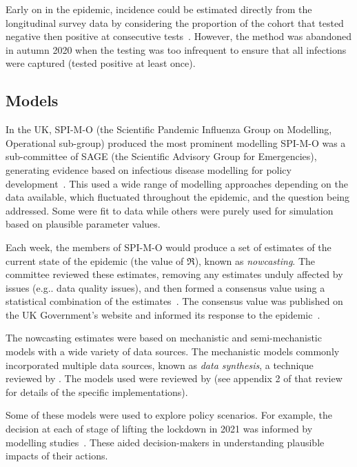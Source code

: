\documentclass[thesis.tex]{subfiles}
\begin{document}
Early on in the epidemic, incidence could be estimated directly from the longitudinal survey data by considering the proportion of the cohort that tested negative then positive at consecutive tests~\autocite{onsIncidenceOld}.
However, the method was abandoned in autumn 2020 when the testing was too infrequent to ensure that all infections were captured (\ie tested positive at least once).

\subsection{Models}

In the UK, SPI-M-O (the Scientific Pandemic Influenza Group on Modelling, Operational sub-group) produced the most prominent modelling
SPI-M-O was a sub-committee of SAGE (the Scientific Advisory Group for Emergencies), generating evidence based on infectious disease modelling for policy development~\autocite{medleySPIM,govSPIMO}.
This used a wide range of  modelling approaches depending on the data available, which fluctuated throughout the epidemic, and the question being addressed.
Some were fit to data while others were purely used for simulation based on plausible parameter values.

Each week, the members of SPI-M-O would produce a set of estimates of the current state of the epidemic (\eg the value of $\Re$), known as \emph{nowcasting}.
The committee reviewed these estimates, removing any estimates unduly affected by issues (e.g.. data quality issues), and then formed a consensus value using a statistical combination of the estimates~\autocite{parkCombining}.
The consensus value was published on the UK Government's website and informed its response to the epidemic~\autocite{govRnumber}.

The nowcasting estimates were based on mechanistic and semi-mechanistic models with a wide variety of data sources.
The mechanistic models commonly incorporated multiple data sources, known as \emph{data synthesis}, a technique reviewed by \textcite{birrellEvidence}.
The models used were reviewed by \textcite{royalSocietyRnumber} (see appendix 2 of that review for details of the specific implementations).

Some of these models were used to explore policy scenarios.
For example, the decision at each of stage of lifting the lockdown in 2021 was informed by modelling studies~\autocite{sageEvidence}.
These aided decision-makers in understanding plausible impacts of their actions.
\end{document}
